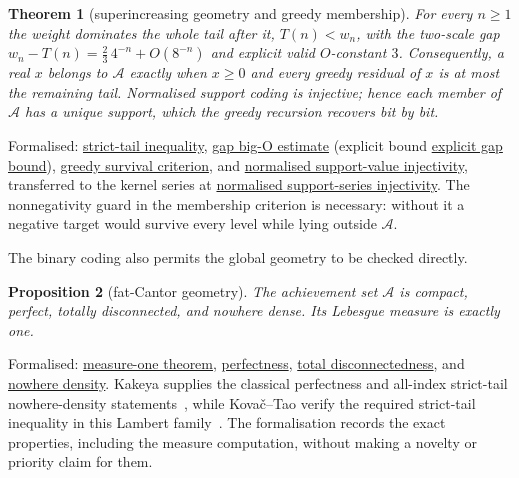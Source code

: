 \documentclass[11pt]{article}
\newcommand{\commit}{bb4e24651b37cd096d3749ef299c3317930b3a3b}
\newcommand{\repobase}{https://github.com/wcook04/plectis-lean-erdos249-257/blob/\commit}
\newcommand{\PK}{Erdos249257}
\newcommand{\lword}[4]{\href{\repobase/\PK/#1\#L#2}{#4}}
\newtheorem{theorem}{Theorem}[section]
\newtheorem{proposition}[theorem]{Proposition}
\theoremstyle{definition}
\theoremstyle{remark}
\begin{document}
\begin{theorem}[superincreasing geometry and greedy membership]\label{res:greedy-details}
For every $n\ge1$ the weight dominates the whole tail after it, $T(n)<w_n$,
with the two-scale gap $w_n-T(n)=\tfrac23\,4^{-n}+O(8^{-n})$ and explicit
valid $O$-constant $3$. Consequently, a real $x$ belongs to $\mathcal A$
exactly when $x\ge0$ and every greedy residual of $x$ is at most the remaining
tail. Normalised support coding is injective; hence each member of $\mathcal A$
has a unique support, which the greedy recursion recovers bit by bit.
\end{theorem}
\noindent Formalised:
\lword{GreedyAchievementSet.lean}{180}{mersenneTail_lt_weight}{strict-tail inequality},
\lword{GreedyAchievementSet.lean}{473}{mersenneGap_isBigOWith}{gap big-O estimate} (explicit bound
\lword{GreedyAchievementSet.lean}{448}{mersenneGap_asymptotic_bound}{explicit gap bound}),
\lword{GreedyAchievementSet.lean}{1458}{mem_mersenneAchievementSet_iff_greedy_survival}{greedy survival criterion},
and
\lword{GreedyAchievementSet.lean}{1563}{positiveMersenneSupportValue_injective_normalized}{normalised support-value injectivity},
transferred to the kernel series at
\lword{GreedyAchievementSet.lean}{1572}{erdosSupportSeries_two_injective_normalized}{normalised support-series injectivity}.
The nonnegativity guard in the membership criterion is necessary: without it a
negative target would survive every level while lying outside $\mathcal A$.

The binary coding also permits the global geometry to be checked directly.

\begin{proposition}[fat-Cantor geometry]\label{res:greedytopology}
The achievement set $\mathcal A$ is compact, perfect, totally disconnected,
and nowhere dense.  Its Lebesgue measure is exactly one.
\end{proposition}
\noindent Formalised:
\lword{GreedyAchievementSet.lean}{996}{volume_mersenneAchievementSet}{measure-one theorem},
\lword{GreedyAchievementSet.lean}{1656}{perfect_mersenneAchievementSet}{perfectness},
\lword{GreedyAchievementSet.lean}{1672}{isTotallyDisconnected_mersenneAchievementSet}{total disconnectedness},
and
\lword{GreedyAchievementSet.lean}{1681}{isNowhereDense_mersenneAchievementSet}{nowhere density}.
Kakeya supplies the classical perfectness and all-index strict-tail
nowhere-density statements~\cite[p.~251]{kakeya1914}, while
Kova\v{c}--Tao verify the required strict-tail inequality in this Lambert
family~\cite[Remark~4.1, p.~13]{kovactao}.  The formalisation records the exact
properties, including the measure computation, without making a novelty or
priority claim for them.
\end{document}
